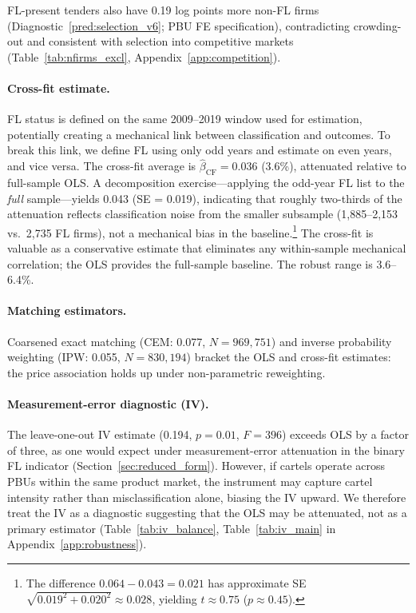

FL-present tenders also have 0.19 log points more non-FL firms
(Diagnostic~\ref{pred:selection_v6}; PBU FE specification),
contradicting crowding-out and consistent with selection
into competitive markets
(Table~\ref{tab:nfirms_excl}, Appendix~\ref{app:competition}).

\paragraph{Cross-fit estimate.}
FL status is defined on the same 2009--2019 window used for
estimation, potentially creating a mechanical link between
classification and outcomes. To break this link, we define FL using
only odd years and estimate on even years, and vice versa. The
cross-fit average is $\hat{\beta}_{\text{CF}} = 0.036$ (3.6\%),
attenuated relative to full-sample OLS. A decomposition
exercise---applying the odd-year FL list to the \emph{full}
sample---yields 0.043 (SE = 0.019), indicating that roughly
two-thirds of the attenuation reflects classification noise from
the smaller subsample (1,885--2,153 vs.\ 2,735 FL firms),
not a mechanical bias in the baseline.\footnote{The difference
$0.064 - 0.043 = 0.021$ has approximate SE
$\sqrt{0.019^2 + 0.020^2} \approx 0.028$, yielding $t \approx 0.75$
($p \approx 0.45$).}
The cross-fit is valuable as a conservative estimate that eliminates
any within-sample mechanical correlation; the OLS provides the
full-sample baseline. The robust range is 3.6--6.4\%.

\paragraph{Matching estimators.}
Coarsened exact matching (CEM: 0.077, $N = 969{,}751$) and inverse
probability weighting (IPW: 0.055, $N = 830{,}194$) bracket the OLS
and cross-fit estimates: the price association holds up under non-parametric
reweighting.

\paragraph{Measurement-error diagnostic (IV).}
The leave-one-out IV estimate (0.194, $p = 0.01$, $F = 396$) exceeds
OLS by a factor of three, as one would expect under measurement-error
attenuation in the binary FL indicator
(Section~\ref{sec:reduced_form}). However, if cartels operate across
PBUs within the same product market, the instrument may capture cartel
intensity rather than misclassification alone, biasing the IV upward.
We therefore treat the IV as a diagnostic suggesting that the OLS
may be attenuated, not as a primary estimator
(Table~\ref{tab:iv_balance}, Table~\ref{tab:iv_main} in
Appendix~\ref{app:robustness}).


